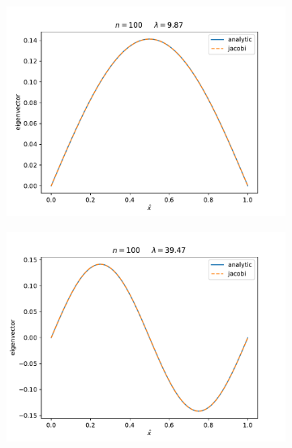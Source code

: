\documentclass[english,notitlepage]{revtex4-1}  %
\begin{document}
\begin{enumerate}[label= \alph*)]
    \begin{figure}[H]
        \centering
        \begin{subfigure}{.45 \textwidth}
        \includegraphics[width=1.1\textwidth]{../figures/eigvec_100_0.pdf}
        \caption{}
        \label{fig:eigvec_100_0}
    \end{subfigure}
    \begin{subfigure}{.45 \textwidth}
        \includegraphics[width=1.1\textwidth]{../figures/eigvec_100_1.pdf}
        \caption{}
        \label{fig:eigvec_100_1}
    \end{subfigure}
    \begin{subfigure}{.45 \textwidth}

\end{subfigure}
\end{figure}
\end{enumerate}
\end{document}
